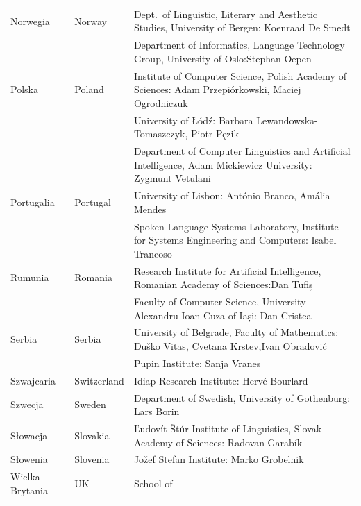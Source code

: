 \begin{longtable}{llp{115mm}}
\addlinespace Norwegia & \textcolor{grey1}{Norway} & Dept.~of Linguistic, Literary and Aesthetic Studies, University of Bergen: Koenraad De Smedt\\
\addlinespace & & Department of Informatics, Language Technology
Group, University of Oslo:\newline Stephan Oepen\\
\addlinespace Polska & \textcolor{grey1}{Poland} & Institute of
Computer Science, Polish Academy of Sciences: \newline Adam
Przepiórkowski, Maciej Ogrodniczuk\\
\addlinespace & & University of Łódź: Barbara
Lewandowska-Tomaszczyk, Piotr Pęzik\\
\addlinespace & & Department of Computer Linguistics and Artificial
Intelligence, Adam Mickiewicz University: Zygmunt Vetulani\\
\addlinespace Portugalia & \textcolor{grey1}{Portugal} & University of
Lisbon: António Branco, Amália Mendes\\
\addlinespace & & Spoken Language Systems Laboratory, Institute for
Systems Engineering and Computers: Isabel Trancoso\\
\addlinespace Rumunia & \textcolor{grey1}{Romania} & Research
Institute for Artificial Intelligence, Romanian Academy of
Sciences:\newline Dan Tufiș\\
\addlinespace & & Faculty of Computer Science, University Alexandru
Ioan Cuza of Iași: Dan Cristea\\
\addlinespace Serbia & \textcolor{grey1}{Serbia} & University of
Belgrade, Faculty of Mathematics: Duško Vitas, Cvetana
Krstev,\newline Ivan Obradović\\
\addlinespace & & Pupin Institute: Sanja Vranes\\
\addlinespace Szwajcaria & \textcolor{grey1}{Switzerland} & Idiap
Research Institute: Hervé Bourlard\\
\addlinespace Szwecja & \textcolor{grey1}{Sweden} & Department of
Swedish, University of Gothenburg: Lars Borin\\
\addlinespace Słowacja & \textcolor{grey1}{Slovakia} & Ľudovít
Štúr Institute of Linguistics, Slovak Academy of Sciences: Radovan
Garabík\\
\addlinespace Słowenia & \textcolor{grey1}{Slovenia} & Jožef Stefan
Institute: Marko Grobelnik\\
\addlinespace Wielka Brytania & \textcolor{grey1}{UK} & School of

\end{longtable}
